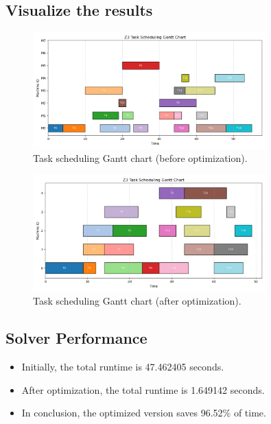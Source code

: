\documentclass{article}
\begin{document}
\subsection{Visualize the results}
\begin{figure}[h] 
    \centering
    \includegraphics[width=0.8\textwidth]{7a.png} 
    \caption{Task scheduling Gantt chart (before optimization).} 
    \label{fig:gantt} 
\end{figure}
\begin{figure}[h] 
    \centering
    \includegraphics[width=0.8\textwidth]{7a_opt.png} 
    \caption{Task scheduling Gantt chart (after optimization).} 
    \label{fig:gantt} 
\end{figure}

\subsection{Solver Performance}
\begin{itemize}
    \item Initially, the total runtime is 47.462405 seconds.
    \item After optimization, the total runtime is 1.649142 seconds.
    \item In conclusion, the optimized version saves 96.52\% of time.
\end{itemize}
\end{document}
